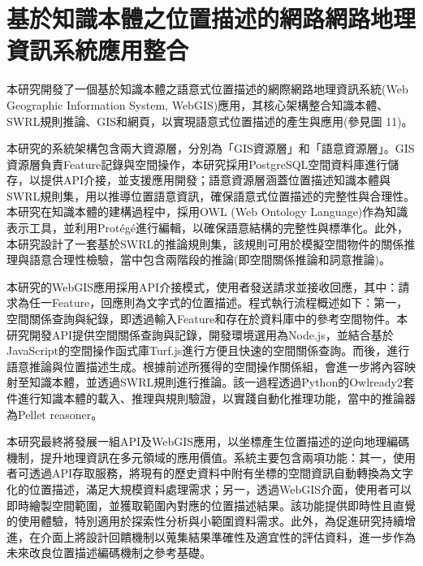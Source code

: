 
\chapter{基於知識本體之位置描述的網路網路地理資訊系統應用整合}

本研究開發了一個基於知識本體之語意式位置描述的網際網路地理資訊系統(Web Geographic Information System, WebGIS)應用，其核心架構整合知識本體、SWRL規則推論、GIS和網頁，以實現語意式位置描述的產生與應用(參見圖 11)。

本研究的系統架構包含兩大資源層，分別為「GIS資源層」和「語意資源層」。GIS資源層負責Feature記錄與空間操作，本研究採用PostgreSQL空間資料庫進行儲存，以提供API介接，並支援應用開發；語意資源層涵蓋位置描述知識本體與SWRL規則集，用以推導位置語意資訊，確保語意式位置描述的完整性與合理性。本研究在知識本體的建構過程中，採用OWL (Web Ontology Language)作為知識表示工具，並利用Protégé進行編輯，以確保語意結構的完整性與標準化。此外，本研究設計了一套基於SWRL的推論規則集，該規則可用於模擬空間物件的關係推理與語意合理性檢驗，當中包含兩階段的推論(即空間關係推論和詞意推論)。

本研究的WebGIS應用採用API介接模式，使用者發送請求並接收回應，其中：請求為任一Feature，回應則為文字式的位置描述。程式執行流程概述如下：第一，空間關係查詢與紀錄，即透過輸入Feature和存在於資料庫中的參考空間物件。本研究開發API提供空間關係查詢與記錄，開發環境選用為Node.js，並結合基於JavaScript的空間操作函式庫Turf.js進行方便且快速的空間關係查詢。而後，進行語意推論與位置描述生成。根據前述所獲得的空間操作關係組，會進一步將內容映射至知識本體，並透過SWRL規則進行推論。該一過程透過Python的Owlready2套件進行知識本體的載入、推理與規則驗證，以實踐自動化推理功能，當中的推論器為Pellet reasoner。

本研究最終將發展一組API及WebGIS應用，以坐標產生位置描述的逆向地理編碼機制，提升地理資訊在多元領域的應用價值。系統主要包含兩項功能：其一，使用者可透過API存取服務，將現有的歷史資料中附有坐標的空間資訊自動轉換為文字化的位置描述，滿足大規模資料處理需求；另一，透過WebGIS介面，使用者可以即時繪製空間範圍，並獲取範圍內對應的位置描述結果。該功能提供即時性且直覺的使用體驗，特別適用於探索性分析與小範圍資料需求。此外，為促進研究持續增進，在介面上將設計回饋機制以蒐集結果準確性及適宜性的評估資料，進一步作為未來改良位置描述編碼機制之參考基礎。
